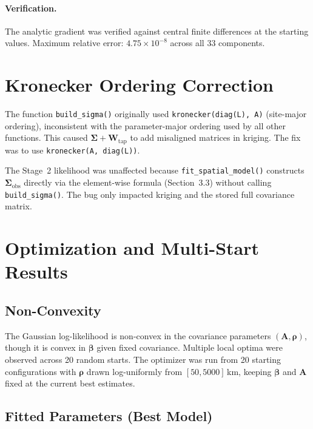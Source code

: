\documentclass[11pt]{article}
\newcommand{\bbeta}{\bm{\beta}}
\newcommand{\bA}{\mathbf{A}}
\newcommand{\bW}{\mathbf{W}}
\newcommand{\bSigma}{\bm{\Sigma}}
\begin{document}
\paragraph{Verification.} The analytic gradient was verified against central finite differences at the starting values. Maximum relative error: $4.75 \times 10^{-8}$ across all 33 components.

\section{Kronecker Ordering Correction}
\label{sec:bugfix}

The function \texttt{build\_sigma()} originally used \texttt{kronecker(diag(L), A)} (site-major ordering), inconsistent with the parameter-major ordering used by all other functions. This caused $\bSigma + \bW_{\text{tap}}$ to add misaligned matrices in kriging. The fix was to use \texttt{kronecker(A, diag(L))}.

The Stage~2 likelihood was unaffected because \texttt{fit\_spatial\_model()} constructs $\bSigma_{\text{obs}}$ directly via the element-wise formula (Section~3.3) without calling \texttt{build\_sigma()}. The bug only impacted kriging and the stored full covariance matrix.

\section{Optimization and Multi-Start Results}
\label{sec:multistart}

\subsection{Non-Convexity}

The Gaussian log-likelihood is non-convex in the covariance parameters $(\bA, \bm{\rho})$, though it is convex in $\bbeta$ given fixed covariance. Multiple local optima were observed across 20 random starts. The optimizer was run from 20 starting configurations with $\bm{\rho}$ drawn log-uniformly from $[50, 5000]$\,km, keeping $\bbeta$ and $\bA$ fixed at the current best estimates.

\subsection{Fitted Parameters (Best Model)}
\end{document}
